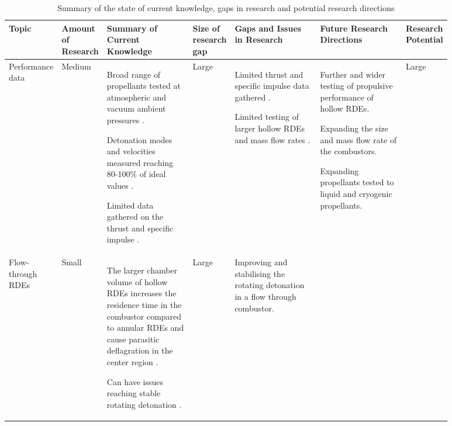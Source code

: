 \documentclass{article}
\begin{document}
\begin{landscape}
\begin{table}[ht]
	\caption{Summary of the state of current knowledge, gaps in research and potential research directions}
	\centering
	\begin{tabular}{p{0.1\linewidth} | p{0.06\linewidth} | p{0.2\linewidth} | p{0.06\linewidth} | p{0.2\linewidth} | p{0.2\linewidth} | p{0.06\linewidth}}
		\toprule
		Topic     & Amount of Research    & Summary of Current Knowledge & Size of research gap & Gaps and Issues in Research & Future Research Directions & Research Potential\\
		\midrule
		Performance data & \cellcolor[HTML]{FFE5D9} Medium &  
        Broad range of propellants tested at atmospheric and vacuum ambient pressures \cite{Liu2021,Yokoo2021,1ISHIHARA2023,1Huang2022,Huang2023}.
        \par
        Detonation modes and velocities measured  reaching 80-100\% of ideal values \cite{Lin2015}.
        \par
        Limited data gathered on the thrust and specific impulse \cite{Ishihara2023,Goto2021,1ISHIHARA2023}.
        \par
        & \cellcolor[HTML]{D8E2DC} Large &
        Limited thrust and specific impulse data gathered \cite{Ishihara2023,Goto2021,1ISHIHARA2023}.
        \par
        Limited testing of larger hollow RDEs and mass flow rates \cite{Wiggins2023,1Wiggins2021}.
        \par
        &  
        Further and wider testing of propulsive performance of hollow RDEs.
        \par
        Expanding the size and mass flow rate of the combustors.
        \par
        Expanding propellants tested to liquid and cryogenic propellants.
        \par
        &
        \cellcolor[HTML]{D8E2DC} Large\\
        \midrule
		Flow-through RDEs & \cellcolor[HTML]{FFCAD4} Small &
        The larger chamber volume of hollow RDEs increases the residence time in the combustor compared to annular RDEs and cause parasitic deflagration in the center region \cite{Wiggins2021}.
        \par
        Can have issues reaching stable rotating detonation \cite{1Wiggins2021}.
        \par
        & \cellcolor[HTML]{D8E2DC} Large &
        Improving and stabilising the rotating detonation in a flow through combustor.

\end{tabular}
\end{table}
\end{landscape}
\end{document}
